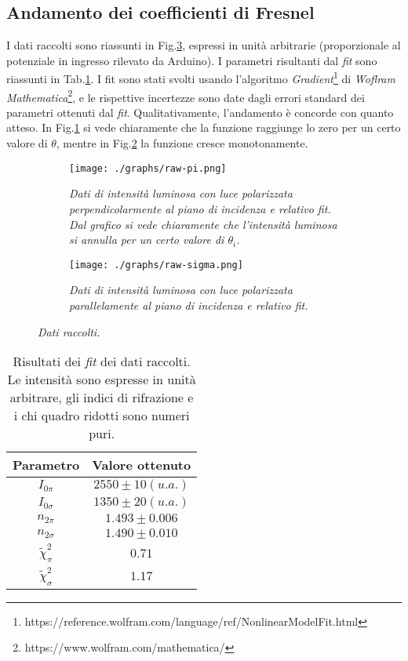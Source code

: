 \subsection{Andamento dei coefficienti di Fresnel}\label{subsec:analisi-coefficienti}
  I dati raccolti sono riassunti in Fig.\ref{fig:dati-raw}, espressi in unità arbitrarie (proporzionale
  al potenziale in ingresso rilevato da Arduino).
  I parametri risultanti dal \emph{fit} sono riassunti in Tab.\ref{tab:risultati-fit}.
  I fit sono stati svolti usando l'algoritmo \emph{Gradient}\footnote{https://reference.wolfram.com/language/ref/NonlinearModelFit.html} di \emph{Woflram Mathematica}\footnote{https://www.wolfram.com/mathematica/}, e le rispettive incertezze %
  sono date dagli errori standard dei parametri ottenuti dal \emph{fit}.                                          %
  Qualitativamente, l'andamento è concorde con quanto atteso. In Fig.\ref{fig:raw-pi}
  si vede chiaramente che la funzione raggiunge lo zero per un certo valore di $\theta$,
  mentre in Fig.\ref{fig:raw-sigma} la funzione cresce monotonamente.
  \begin{figure}[H]
    \centering
    \begin{subfigure}[t]{.42\textwidth}
      \texttt{[image: ./graphs/raw-pi.png]}
      \caption{
        \emph{
          Dati di intensità luminosa con luce polarizzata perpendicolarmente al
          piano di incidenza e relativo fit. Dal grafico si vede chiaramente che
          l'intensità luminosa si annulla per un certo valore di $\theta_i$.
        }
      }
      \label{fig:raw-pi}
    \end{subfigure}
    \hspace{5mm}
    \begin{subfigure}[t]{.42\textwidth}
      \texttt{[image: ./graphs/raw-sigma.png]}
      \caption{
        \emph{
          Dati di intensità luminosa con luce polarizzata parallelamente al
          piano di incidenza e relativo fit.
        }
      }
      \label{fig:raw-sigma}
    \end{subfigure}
    \caption{\emph{Dati raccolti.}
    \label{fig:dati-raw}}
  \end{figure}
  \begin{table}[ht]
    \centering
    \caption{
      Risultati dei \emph{fit} dei dati raccolti. Le intensità sono espresse in unità arbitrare, gli indici
      di rifrazione e i chi quadro ridotti sono numeri puri.
    }
    \begin{tabular}[t]{cc}
      \toprule
      Parametro &Valore ottenuto\\
      \midrule
      $I_{0\pi}$ &$2550 \pm 10 (u. a.)$ \\
      $I_{0\sigma}$ &$1350 \pm 20 (u. a.)$ \\
      $n_{2\pi}$ &$1.493 \pm 0.006$    \\
      $n_{2\sigma}$ &$1.490 \pm 0.010$    \\
      $\tilde \chi^2_\pi$ &$0.71$ \\
      $\tilde \chi^2_\sigma$ &$1.17$ \\
      \bottomrule
    \end{tabular}\label{tab:risultati-fit}
  \end{table}
